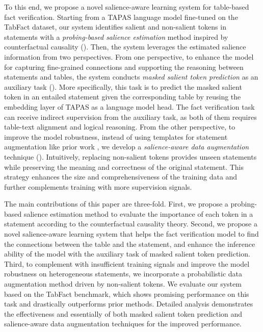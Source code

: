 \documentclass[11pt]{article}
\begin{document}
To this end, we propose a novel salience-aware learning system for table-based fact verification.
Starting from a TAPAS \cite{herzig2020tapas} language model fine-tuned on the TabFact dataset, 
our system identifies salient and non-salient tokens in statements with a \emph{probing-based salience estimation} method inspired by counterfactual causality \cite{pearl2009causality} ().
Then, the system leverages the estimated salience information from two perspectives.
From one perspective, to enhance the model for capturing fine-grained connections and supporting the reasoning between statements and tables, the system conducts \emph{masked salient token prediction} as an auxiliary task (). 
More specifically, this task is to predict the masked salient token in an entailed statement given the corresponding table by reusing the embedding layer of TAPAS as a language model head.
The fact verification task can receive indirect supervision from the auxiliary task, as both of them requires table-text alignment and logical reasoning. 
From the other perspective,
to improve the model robustness, instead of using templates for statement augmentation like prior work \cite{eisenschlos2020understanding},
we develop a \emph{salience-aware data augmentation} technique (). 
Intuitively, replacing non-salient tokens provides unseen statements while preserving the meaning and correctness of the original statement.
This strategy enhances the size and comprehensiveness of the training data and further complements training with more supervision signals.



The main contributions of this paper are three-fold.
First, we propose a probing-based salience estimation method to evaluate the importance of each token in a statement according to the counterfactual causality theory. 
Second, we propose a novel salience-aware learning system that helps the fact verification model to find the connections between the table and the statement, and enhance the inference ability of the model with the auxiliary task of masked salient token prediction. Third, to complement with insufficient training signals and improve the model robustness on heterogeneous statements, we incorporate a probabilistic data augmentation method driven by non-salient tokens.
We evaluate our system based on the TabFact benchmark, which shows promising performance on this task and drastically outperforms prior methods.
Detailed analysis demonstrates the effectiveness and essentially of both masked salient token prediction and salience-aware data augmentation techniques for the improved performance.
\end{document}
